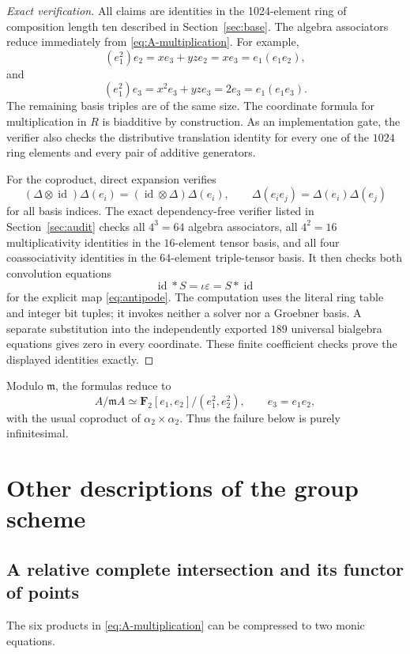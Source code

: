\documentclass[11pt]{article}
\theoremstyle{remark}
\newcommand{\F}{\mathbf F}
\newcommand{\id}{\operatorname{id}}
\newcommand{\eps}{\varepsilon}
\newcommand{\m}{\mathfrak m}
\begin{document}
\begin{proof}[Exact verification]
All claims are identities in the 1024-element ring of composition length ten described in
Section~\ref{sec:base}.  The algebra associators reduce immediately from
\eqref{eq:A-multiplication}.  For example,
\[
 (e_1^2)e_2=xe_3+yz e_2=xe_3=e_1(e_1e_2),
\]
and
\[
 (e_1^2)e_3=x^2e_3+yz e_3=2e_3=e_1(e_1e_3).
\]
The remaining basis triples are of the same size.
The coordinate formula for multiplication in \(R\) is biadditive by
construction.  As an implementation gate, the verifier also checks the
distributive translation identity for every one of the \(1024\) ring
elements and every pair of additive generators.

For the coproduct, direct expansion verifies
\[
 (\Delta\otimes\id)\Delta(e_i)
 =(\id\otimes\Delta)\Delta(e_i),
 \qquad
 \Delta(e_ie_j)=\Delta(e_i)\Delta(e_j)
\]
for all basis indices.  The exact dependency-free verifier listed in
Section~\ref{sec:audit} checks all \(4^3=64\) algebra associators, all
\(4^2=16\) multiplicativity identities in the \(16\)-element tensor basis,
and all four coassociativity identities in the \(64\)-element triple-tensor
basis.  It then checks both convolution equations
\[
 \id*S=\iota\eps=S*\id
\]
for the explicit map \eqref{eq:antipode}.  The computation uses the literal
ring table and integer bit tuples; it invokes neither a solver nor a
Groebner basis.  A separate substitution into the independently exported
\(189\) universal bialgebra equations gives zero in every coordinate.
These finite coefficient checks prove the displayed identities exactly.
\end{proof}

Modulo \(\m\), the formulas reduce to
\[
 A/\m A\simeq\F_2[e_1,e_2]/(e_1^2,e_2^2),\qquad e_3=e_1e_2,
\]
with the usual coproduct of \(\alpha_2\times\alpha_2\).  Thus the failure
below is purely infinitesimal.

\section{Other descriptions of the group scheme}\label{sec:descriptions}

\subsection{A relative complete intersection and its functor of points}

The six products in \eqref{eq:A-multiplication} can be compressed to two
monic equations.
\end{document}
